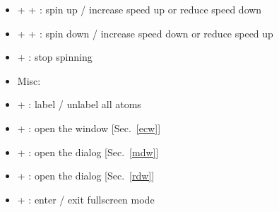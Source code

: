{\begin{itemize}
\begin{itemize}
\item[] \Ctrl + \Shift + \UArrow : spin up / increase speed up or reduce speed down
\item[] \Ctrl + \Shift + \DArrow : spin down / increase speed down or reduce speed up
\item[] \Ctrl +  : stop spinning \\
\item Misc:
\item[] \Ctrl +  : label / unlabel all atoms 
\item[] \Ctrl +  : open the  window [Sec.~\ref{ecw}]
\item[] \Ctrl +  : open the  dialog [Sec.~\ref{mdw}]
\item[] \Ctrl +  : open the  dialog [Sec.~\ref{rdw}]
\item[] \Ctrl +  : enter / exit fullscreen mode 
\end{itemize}
\end{itemize}}


